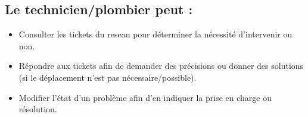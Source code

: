 \documentclass[a4paper, 11pt]{article}
\begin{document}
\subsection{Le technicien/plombier peut :}
\begin{itemize}
  \item Consulter les \glspl{ticket} du \gls{reseau} pour déterminer la nécessité d'intervenir ou non.
  \item Répondre aux \glspl{ticket} afin de demander des précisions ou donner des solutions (si le déplacement n'est pas nécessaire/possible).
  \item Modifier l'état d'un problème afin d'en indiquer la prise en charge ou résolution.
\end{itemize}

  \begin{mdframed}[style=HighlightQuestion]

\end{mdframed}
\end{document}
